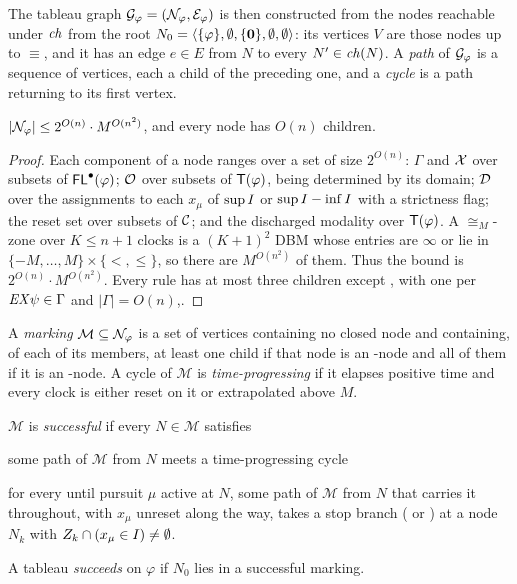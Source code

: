 The tableau graph $\mathcal{G}_{\varphi} = (\mathcal{N}_{\varphi}, \mathcal{E}_{\varphi})$ is then constructed from the nodes reachable under $\mathit{ch}$ from the
root $N_0=\langle \{\varphi\}, \emptyset, \{\mathbf 0\}, \emptyset, \emptyset\rangle$: its vertices $V$ are
those nodes up to $\equiv$, and it has an edge $e\in E$ from $N$ to every $N'\in\mathit{ch}(N)$. A \emph{path} of $\mathcal{G}_{\varphi}$ is a sequence of vertices, each a child of the preceding one, and a \emph{cycle} is a path returning to its first vertex.


\begin{lemma}%
  \label{lem:finiteness}
$|\mathcal{N}_{\varphi}|\le 2^{O(n)}\cdot M^{O(n^{2})}$, and every node has $O(n)$ children.
\end{lemma}
\begin{proof}
  Each component of a node ranges over a set of size $2^{O(n)}$: $\Gamma$ and $\mathcal{X}$ over subsets
of $\mathsf{FL}^{\bullet}(\varphi)$; $\mathcal{O}$ over subsets of $\mathsf{T}(\varphi)$, being determined by
its domain; $\mathcal{D}$ over the assignments to each $x_\mu$ of $\sup I$ or $\sup I-\inf I$ with a
strictness flag; the reset set over subsets of $\mathcal{C}$; and the discharged modality over
$\mathsf{T}(\varphi)$. A $\cong_M$-zone over $K\le n+1$ clocks is a $(K{+}1)^{2}$ DBM whose
entries are $\infty$ or lie in $\{-M,\dots,M\}\times\{<,\le\}$, so there are $M^{O(n^{2})}$ of
them. Thus the bound is $2^{O(n)}\cdot M^{O(n^{2})}$. Every rule has at most three children except
, with one per $\mathit{EX}\psi\in\Gamma$ and $|\Gamma|=O(n)$,.
\end{proof}


A \emph{marking} $\mathcal M \subseteq \mathcal{N}_{\varphi}$ is a set of vertices containing no closed node and containing, of each
of its members, at least one child if that node is an \ORn-node and all of them if it is an
\ANDn-node. A cycle of $\mathcal M$ is \emph{time-progressing} if it elapses positive time and every
clock is either reset on it or extrapolated above $M$. 

$\mathcal M$ is \emph{successful} if
every $N\in\mathcal M$ satisfies
\begin{enumerate*}[label={\textbf{(M\arabic*)}}, ref={\textbf{(M\arabic*)}},
                   itemjoin={{; }}, itemjoin*={{; and }}]
\item\label{M1} some path of $\mathcal M$ from $N$ meets a time-progressing cycle
\item\label{M2} for every until pursuit $\mu$ active at $N$,  some path of
$\mathcal M$ from $N$ that carries it throughout, with $x_\mu$ unreset along the way, takes a stop
branch ( or
) at a node $N_k$ with $Z_k\cap(x_\mu\in I)\neq\emptyset$.
\end{enumerate*}
\noindent
A tableau \emph{succeeds} on $\varphi$ if $N_0$ lies in a successful marking.


